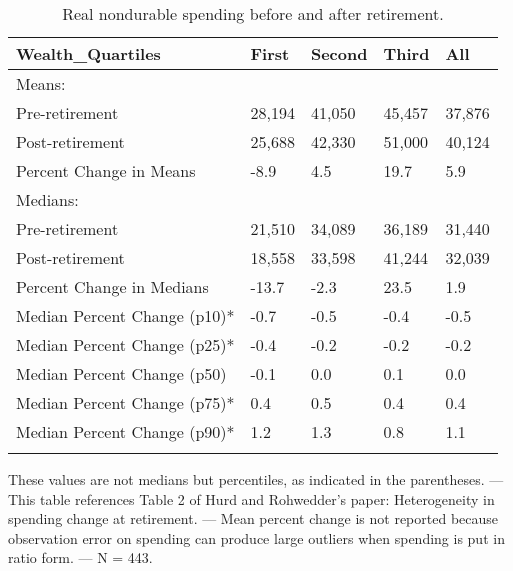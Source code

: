 \begin{table}[tbp] \centering
{}

\caption{Real nondurable spending before and after retirement.}
\begin{tabularx}{\textwidth}{lCCCC}

\toprule
{Wealth\_Quartiles}&{First}&{Second}&{Third}&{All} \tabularnewline
\midrule\addlinespace[1.5ex]
Means:&&&& \tabularnewline
\midrule Pre-retirement&28,194&41,050&45,457&37,876 \tabularnewline
Post-retirement&25,688&42,330&51,000&40,124 \tabularnewline
Percent Change in Means&-8.9&4.5&19.7&5.9 \tabularnewline
\midrule Medians:&&&& \tabularnewline
\midrule Pre-retirement&21,510&34,089&36,189&31,440 \tabularnewline
Post-retirement&18,558&33,598&41,244&32,039 \tabularnewline
Percent Change in Medians&-13.7&-2.3&23.5&1.9 \tabularnewline
Median Percent Change (p10)*&-0.7&-0.5&-0.4&-0.5 \tabularnewline
Median Percent Change (p25)*&-0.4&-0.2&-0.2&-0.2 \tabularnewline
Median Percent Change (p50)&-0.1&0.0&0.1&0.0 \tabularnewline
Median Percent Change (p75)*&0.4&0.5&0.4&0.4 \tabularnewline
Median Percent Change (p90)*&1.2&1.3&0.8&1.1 \tabularnewline
\bottomrule \addlinespace[1.5ex]

\end{tabularx}
\begin{flushleft}
\footnotesize *These values are not medians but percentiles, as indicated in the parentheses. \linebreak --- \linebreak This table references Table 2 of Hurd and Rohwedder's paper: Heterogeneity in spending change at retirement. \linebreak --- \linebreak Mean percent change is not reported because observation error on spending can produce large outliers when spending is put in ratio form. \linebreak --- \linebreak N = 443.
\end{flushleft}
\end{table}
